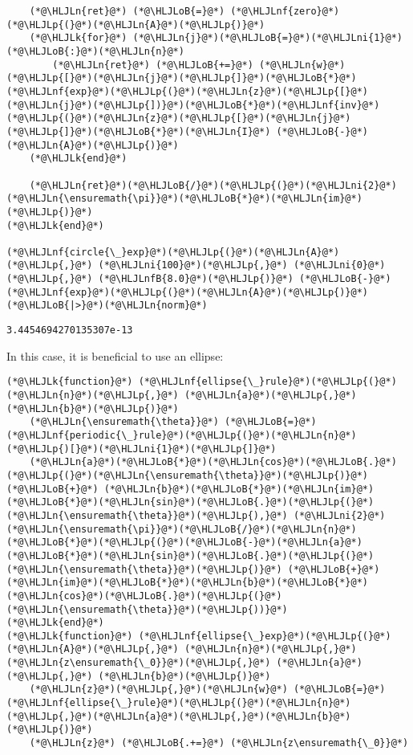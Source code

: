 \documentclass[12pt,landscape]{article}
\newcommand{\HLJLk}[1]{\textcolor[RGB]{148,91,176}{\textbf{#1}}}
\newcommand{\HLJLn}[1]{#1}
\newcommand{\HLJLnf}[1]{\textcolor[RGB]{66,102,213}{#1}}
\newcommand{\HLJLnfB}[1]{\textcolor[RGB]{59,151,46}{#1}}
\newcommand{\HLJLni}[1]{\textcolor[RGB]{59,151,46}{#1}}
\newcommand{\HLJLoB}[1]{\textcolor[RGB]{102,102,102}{\textbf{#1}}}
\newcommand{\HLJLp}[1]{#1}
\begin{document}
{\begin{lstlisting}
    (*@\HLJLn{ret}@*) (*@\HLJLoB{=}@*) (*@\HLJLnf{zero}@*)(*@\HLJLp{(}@*)(*@\HLJLn{A}@*)(*@\HLJLp{)}@*)
    (*@\HLJLk{for}@*) (*@\HLJLn{j}@*)(*@\HLJLoB{=}@*)(*@\HLJLni{1}@*)(*@\HLJLoB{:}@*)(*@\HLJLn{n}@*)
        (*@\HLJLn{ret}@*) (*@\HLJLoB{+=}@*) (*@\HLJLn{w}@*)(*@\HLJLp{[}@*)(*@\HLJLn{j}@*)(*@\HLJLp{]}@*)(*@\HLJLoB{*}@*)(*@\HLJLnf{exp}@*)(*@\HLJLp{(}@*)(*@\HLJLn{z}@*)(*@\HLJLp{[}@*)(*@\HLJLn{j}@*)(*@\HLJLp{])}@*)(*@\HLJLoB{*}@*)(*@\HLJLnf{inv}@*)(*@\HLJLp{(}@*)(*@\HLJLn{z}@*)(*@\HLJLp{[}@*)(*@\HLJLn{j}@*)(*@\HLJLp{]}@*)(*@\HLJLoB{*}@*)(*@\HLJLn{I}@*) (*@\HLJLoB{-}@*) (*@\HLJLn{A}@*)(*@\HLJLp{)}@*)
    (*@\HLJLk{end}@*)

    (*@\HLJLn{ret}@*)(*@\HLJLoB{/}@*)(*@\HLJLp{(}@*)(*@\HLJLni{2}@*)(*@\HLJLn{\ensuremath{\pi}}@*)(*@\HLJLoB{*}@*)(*@\HLJLn{im}@*)(*@\HLJLp{)}@*)
(*@\HLJLk{end}@*)

(*@\HLJLnf{circle{\_}exp}@*)(*@\HLJLp{(}@*)(*@\HLJLn{A}@*)(*@\HLJLp{,}@*) (*@\HLJLni{100}@*)(*@\HLJLp{,}@*) (*@\HLJLni{0}@*)(*@\HLJLp{,}@*) (*@\HLJLnfB{8.0}@*)(*@\HLJLp{)}@*) (*@\HLJLoB{-}@*)(*@\HLJLnf{exp}@*)(*@\HLJLp{(}@*)(*@\HLJLn{A}@*)(*@\HLJLp{)}@*) (*@\HLJLoB{|>}@*)(*@\HLJLn{norm}@*)
\end{lstlisting}

\begin{lstlisting}
3.4454694270135307e-13
\end{lstlisting}

\newpage
In this case, it is beneficial to use an ellipse:


\begin{lstlisting}
(*@\HLJLk{function}@*) (*@\HLJLnf{ellipse{\_}rule}@*)(*@\HLJLp{(}@*)(*@\HLJLn{n}@*)(*@\HLJLp{,}@*) (*@\HLJLn{a}@*)(*@\HLJLp{,}@*) (*@\HLJLn{b}@*)(*@\HLJLp{)}@*)
    (*@\HLJLn{\ensuremath{\theta}}@*) (*@\HLJLoB{=}@*) (*@\HLJLnf{periodic{\_}rule}@*)(*@\HLJLp{(}@*)(*@\HLJLn{n}@*)(*@\HLJLp{)[}@*)(*@\HLJLni{1}@*)(*@\HLJLp{]}@*)
    (*@\HLJLn{a}@*)(*@\HLJLoB{*}@*)(*@\HLJLn{cos}@*)(*@\HLJLoB{.}@*)(*@\HLJLp{(}@*)(*@\HLJLn{\ensuremath{\theta}}@*)(*@\HLJLp{)}@*) (*@\HLJLoB{+}@*) (*@\HLJLn{b}@*)(*@\HLJLoB{*}@*)(*@\HLJLn{im}@*)(*@\HLJLoB{*}@*)(*@\HLJLn{sin}@*)(*@\HLJLoB{.}@*)(*@\HLJLp{(}@*)(*@\HLJLn{\ensuremath{\theta}}@*)(*@\HLJLp{),}@*) (*@\HLJLni{2}@*)(*@\HLJLn{\ensuremath{\pi}}@*)(*@\HLJLoB{/}@*)(*@\HLJLn{n}@*)(*@\HLJLoB{*}@*)(*@\HLJLp{(}@*)(*@\HLJLoB{-}@*)(*@\HLJLn{a}@*)(*@\HLJLoB{*}@*)(*@\HLJLn{sin}@*)(*@\HLJLoB{.}@*)(*@\HLJLp{(}@*)(*@\HLJLn{\ensuremath{\theta}}@*)(*@\HLJLp{)}@*) (*@\HLJLoB{+}@*) (*@\HLJLn{im}@*)(*@\HLJLoB{*}@*)(*@\HLJLn{b}@*)(*@\HLJLoB{*}@*)(*@\HLJLn{cos}@*)(*@\HLJLoB{.}@*)(*@\HLJLp{(}@*)(*@\HLJLn{\ensuremath{\theta}}@*)(*@\HLJLp{))}@*)
(*@\HLJLk{end}@*)
(*@\HLJLk{function}@*) (*@\HLJLnf{ellipse{\_}exp}@*)(*@\HLJLp{(}@*)(*@\HLJLn{A}@*)(*@\HLJLp{,}@*) (*@\HLJLn{n}@*)(*@\HLJLp{,}@*) (*@\HLJLn{z\ensuremath{\_0}}@*)(*@\HLJLp{,}@*) (*@\HLJLn{a}@*)(*@\HLJLp{,}@*) (*@\HLJLn{b}@*)(*@\HLJLp{)}@*)
    (*@\HLJLn{z}@*)(*@\HLJLp{,}@*)(*@\HLJLn{w}@*) (*@\HLJLoB{=}@*) (*@\HLJLnf{ellipse{\_}rule}@*)(*@\HLJLp{(}@*)(*@\HLJLn{n}@*)(*@\HLJLp{,}@*)(*@\HLJLn{a}@*)(*@\HLJLp{,}@*)(*@\HLJLn{b}@*)(*@\HLJLp{)}@*)
    (*@\HLJLn{z}@*) (*@\HLJLoB{.+=}@*) (*@\HLJLn{z\ensuremath{\_0}}@*)


\end{lstlisting}}
\end{document}
